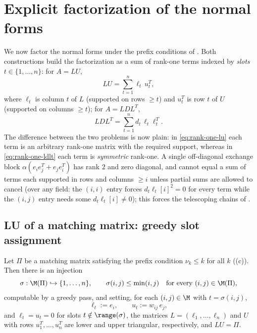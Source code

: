 \section{Explicit factorization of the normal forms}\label{sec:explicit}

We now factor the normal forms under the prefix conditions of
.  Both constructions build the factorization as a
sum of rank-one terms indexed by \emph{slots} $t \in \{1, \ldots, n\}$: for
$A = LU$,
\begin{equation}\label{eq:rank-one-lu}
  LU = \sum_{t=1}^{n} \ell_t \, u_t^T,
\end{equation}
where $\ell_t$ is column $t$ of $L$ (supported on rows $\ge t$) and $u_t^T$
is row $t$ of $U$ (supported on columns $\ge t$); for $A = LDL^T$,
\begin{equation}\label{eq:rank-one-ldlt}
  LDL^T = \sum_{t=1}^{n} d_t \, \ell_t \ell_t^T .
\end{equation}
The difference between the two problems is now plain: in
\cref{eq:rank-one-lu} each term is an arbitrary rank-one matrix with the
required support, whereas in \cref{eq:rank-one-ldlt} each term is
\emph{symmetric} rank-one.  A single off-diagonal exchange block
$\alpha(e_i e_j^T + e_j e_i^T)$ has rank $2$ and zero diagonal, and cannot
equal a sum of terms each supported in rows and columns $\ge i$ unless
partial sums are allowed to cancel (over any field: the $(i,i)$ entry
forces $d_t \ell_t[i]^2 = 0$ for every term while the $(i,j)$ entry needs
some $d_t \ell_t[i] \neq 0$); this forces the telescoping chains of
.

\subsection{LU of a matching matrix: greedy slot assignment}

\begin{theorem}\label{thm:lu-matching}
  Let $\Pi$ be a matching matrix satisfying the prefix condition
  $\nu_k \le k$ for all $k$ ((c)).  Then there is an
  injection
  \begin{equation}\label{eq:slot-injection}
    \sigma : \M(\Pi) \hookrightarrow \{1, \ldots, n\},
    \qquad
    \sigma(i,j) \le \min(i,j) \quad \text{for every } (i,j) \in \M(\Pi),
  \end{equation}
  computable by a greedy pass, and setting, for each $(i,j) \in \M$ with
  $t = \sigma(i,j)$,
  \[
    \ell_t := e_i,
    \qquad
    u_t := w_{ij} \, e_j,
  \]
  and $\ell_t = u_t = 0$ for slots $t \notin \range(\sigma)$, the matrices
  $L = (\ell_1, \ldots, \ell_n)$ and $U$ with rows $u_1^T, \ldots, u_n^T$
  are lower and upper triangular, respectively, and $L U = \Pi$.
\end{theorem}

